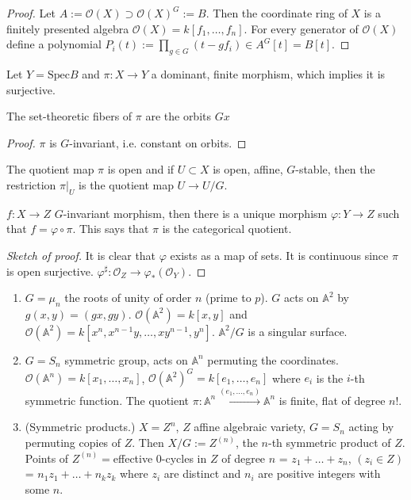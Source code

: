 \begin{proof}
Let $A:=\mathcal{O}(X) \supset
\mathcal{O}(X)^G:=B$. Then the coordinate
ring of $X$ is a finitely presented algebra
$\mathcal{O}(X)=k[f_1,\ldots,f_n]$. For every
generator of  $\mathcal{O}(X)$ define a
polynomial $P_i(t):=\prod_{g \in G}(t-gf_i)
\in A^G[t]=B[t]$.
\end{proof}

Let $Y = \text{Spec}B$ and $\pi:X\to Y$ a
dominant, finite morphism, which implies it
is surjective.

\begin{proposition}
\label{proposition-fibers-of-pi-are-orbits}
The set-theoretic fibers of $\pi$ are the
orbits $Gx$
\end{proposition}

\begin{proof}
$\pi$ is $G$-invariant, i.e. constant on
orbits.
\end{proof}

\begin{proposition}
\label{proposition-2-second}
The quotient map $\pi$ is open and if
$U\subset X$ is open, affine, $G$-stable,
then the restriction $\pi|_{U}$ is the
quotient map $U\to U/G$.
\end{proposition}

\begin{proposition}
\label{git-label-001}
$f:X\to Z$ $G$-invariant morphism, then there
is a unique morphism $\varphi:Y
\to Z$ such that $f=\varphi \circ\pi$. This
says that $\pi$ is the categorical
quotient.
\end{proposition}

\begin{proof}[Sketch of proof]
It is clear that $\varphi$ exists as a map of
sets. It is continuous since $\pi$ is open
surjective. $\varphi^\sharp:\mathcal{O}_Z \to
\varphi_*(\mathcal{O}_Y)$.
\end{proof}

\begin{example}
\label{example-quotients}
\begin{enumerate}
\item $G=\mu_n$ the roots of unity of order
$n$ (prime to $p$). $G$ acts on
$\mathbb{A}^2$ by $g(x,y)=(gx,gy)$.
$\mathcal{O}(\mathbb{A}^2)=k[x,y]$ and
$\mathcal{O}(\mathbb{A}^2)=k[x^n,x^{n-1}y,
\ldots,xy^{n-1},y^n]$.
$\mathbb{A}^2/G$ is a singular surface.
\item $G=S_n$ symmetric group, acts on
$\mathbb{A}^n$ permuting the coordinates.
$\mathcal{O}(\mathbb{A}^n)=k[x_1,\ldots,x_n]
$,
$\mathcal{O}(\mathbb{A}^2)^G=k[e_1,\ldots,
e_n]
$
where $e_i$ is the $i$-th symmetric function.
The quotient
$\pi:\mathbb{A}^n\xrightarrow{(e_1,\ldots,
e_n)
}\mathbb{A}^n$
is finite, flat of degree $n!$.
\item (Symmetric products.) $X=Z^n$, $Z$
affine algebraic variety, $G=S_n$
acting by permuting copies of $Z$. Then
$X/G:=Z^{(n)}$, the $n$-th symmetric product
of $Z$. Points of $Z^{(n)}=$effective
$0$-cycles in $Z$ of degree $n$ =
$z_1+\ldots+z_n$, $(z_i \in Z)$ =
$n_1z_1+\ldots+n_kz_k$ where $z_i$ are
distinct and $n_i$ are positive integers with
some $n$.
\end{enumerate}
\end{example}

